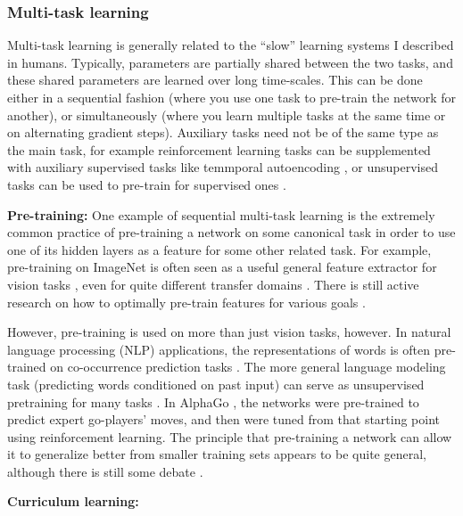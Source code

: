 \documentclass[11pt]{article}
\begin{document}
\subsubsection{Multi-task learning}

Multi-task learning is generally related to the ``slow'' learning systems I described in humans. Typically, parameters are partially shared between the two tasks, and these shared parameters are learned over long time-scales. This can be done either in a sequential fashion (where you use one task to pre-train the network for another), or simultaneously (where you learn multiple tasks at the same time or on alternating gradient steps). Auxiliary tasks need not be of the same type as the main task, for example reinforcement learning tasks can be supplemented with auxiliary supervised tasks like temmporal autoencoding \citep[e.g.]{Hermann2017}, or unsupervised tasks can be used to pre-train for supervised ones \citep[e.g.]{Wu2018}. \par
\textbf{Pre-training:} One example of sequential multi-task learning is the extremely common practice of pre-training a network on some canonical task in order to use one of its hidden layers as a feature for some other related task. For example, pre-training on ImageNet \citep{Deng2009} is often seen as a useful general feature extractor for vision tasks \citep{Huh2016}, even for quite different transfer domains \citep[e.g.]{Marmanis2016}. There is still active research on how to optimally pre-train features for various goals \citep[e.g.]{Wu2018}. \par    
However, pre-training is used on more than just vision tasks, however. In natural language processing (NLP) applications, the representations of words is often pre-trained on co-occurrence prediction tasks \citep[e.g.]{Pennington2014}. The more general language modeling task (predicting words conditioned on past input) can serve as unsupervised pretraining for many tasks \citep[e.g.]{Radford2019}. In AlphaGo \citep{Silver2016}, the networks were pre-trained to predict expert go-players' moves, and then were tuned from that starting point using reinforcement learning. The principle that pre-training a network can allow it to generalize better from smaller training sets appears to be quite general, although there is still some debate \citep[e.g]{He2018}. \par

\textbf{Curriculum learning:} \par
\end{document}
